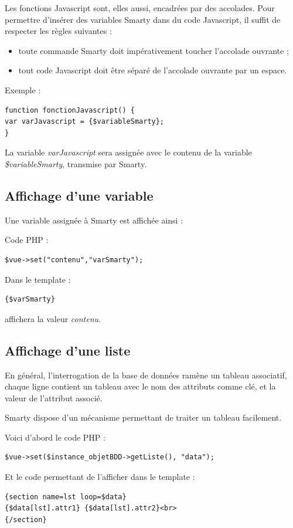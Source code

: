 Les fonctions Javascript sont, elles aussi, encadrées par des accolades. Pour permettre d'insérer des variables Smarty dans du code Javascript, il suffit de respecter les règles suivantes :
\begin{itemize}
\item toute commande Smarty doit impérativement toucher l'accolade ouvrante ;
\item tout code Javascript doit être séparé de l'accolade ouvrante par un espace.
\end{itemize}

Exemple :
\begin{lstlisting}
function fonctionJavascript() {
var varJavascript = {$variableSmarty};
}
\end{lstlisting}

La variable \textit{varJavascript} sera assignée avec le contenu de la variable \textit{\$variableSmarty}, transmise par Smarty.

\subsection{Affichage d'une variable}

Une variable assignée à Smarty est affichée ainsi :

Code PHP :
\begin{lstlisting}
$vue->set("contenu","varSmarty");
\end{lstlisting}

Dans le template :
\begin{lstlisting}
{$varSmarty}
\end{lstlisting}
affichera la valeur \textit{contenu}.


\subsection{Affichage d'une liste}
En général, l'interrogation de la base de données ramène un tableau associatif, chaque ligne contient un tableau avec le nom des attributs comme clé, et la valeur de l'attribut associé.

Smarty dispose d'un mécanisme permettant de traiter un tableau facilement.

Voici d'abord le code PHP :
\begin{lstlisting} 
$vue->set($instance_objetBDD->getListe(), "data");
\end{lstlisting}

Et le code permettant de l'afficher dans le template :
\begin{lstlisting}
{section name=lst loop=$data}
{$data[lst].attr1} {$data[lst].attr2}<br>
{/section}
\end{lstlisting}

